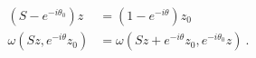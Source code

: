 \begin{equation}
  \label{eq:stab}
  \begin{aligned}
    (S-e^{-i\theta_0})z &= (1 - e^{-i\theta})z_0\\
    \omega(Sz, e^{-i\theta} z_0) &= \omega(Sz + e^{-i\theta}z_0,
    e^{-i\theta_0} z)~.
  \end{aligned}
\end{equation}

